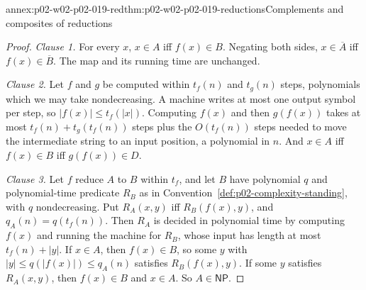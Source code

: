 \begin{annexitem}{annex:p02-w02-p02-019-red}{thm:p02-w02-p02-019-reductions}{Complements and composites of reductions}
\begin{proof}
\emph{Clause 1.}  For every \(x\), \(x\in A\) iff \(f(x)\in B\).  Negating
both sides, \(x\in\overline A\) iff \(f(x)\in\overline B\).  The map and its
running time are unchanged.

\emph{Clause 2.}  Let \(f\) and \(g\) be computed within \(t_f(n)\) and
\(t_g(n)\) steps, polynomials which we may take nondecreasing.  A machine
writes at most one output symbol per step, so \(|f(x)|\leq t_f(|x|)\).
Computing \(f(x)\) and then \(g(f(x))\) takes at most
\(t_f(n)+t_g(t_f(n))\) steps plus the \(O(t_f(n))\) steps needed to move the
intermediate string to an input position, a polynomial in \(n\).  And
\(x\in A\) iff \(f(x)\in B\) iff \(g(f(x))\in D\).

\emph{Clause 3.}  Let \(f\) reduce \(A\) to \(B\) within \(t_f\), and let
\(B\) have polynomial \(q\) and polynomial-time predicate \(R_B\) as in
Convention~\ref{def:p02-complexity-standing}, with \(q\) nondecreasing.  Put
\(R_A(x,y)\) iff \(R_B(f(x),y)\), and \(q_A(n)=q(t_f(n))\).  Then \(R_A\) is
decided in polynomial time by computing \(f(x)\) and running the machine for
\(R_B\), whose input has length at most \(t_f(n)+|y|\).  If \(x\in A\), then
\(f(x)\in B\), so some \(y\) with \(|y|\leq q(|f(x)|)\leq q_A(n)\) satisfies
\(R_B(f(x),y)\).  If some \(y\) satisfies \(R_A(x,y)\), then \(f(x)\in B\)
and \(x\in A\).  So \(A\in\mathsf{NP}\).
\end{proof}
\end{annexitem}

